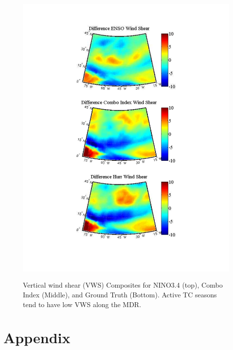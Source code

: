 \documentclass[]{article}
\begin{document}
\begin{figure}[ht]
\begin{minipage}[b]{0.55\linewidth}
\includegraphics[width=\textwidth]{figures/comboIndex/composites/compareMDRCompositesWindShear.pdf}
\caption{Vertical wind shear (VWS) Composites for NINO3.4 (top), Combo Index (Middle), and Ground Truth (Bottom). Active TC seasons tend to have low VWS along the MDR.}
\label{fig:vws_comp}
\end{minipage}
\hspace{0cm}
\begin{minipage}[b]{0.55\linewidth}
\label{fig:figure37}
\end{minipage}
\end{figure}


\clearpage
\section{Appendix}
\end{document}
